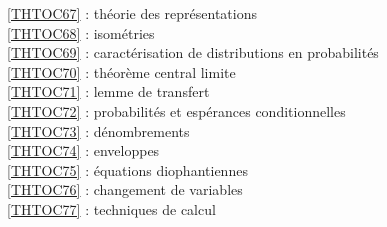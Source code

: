 \ref {THTOC67} : théorie des représentations\\
\ref {THTOC68} : isométries\\
\ref {THTOC69} : caractérisation de distributions en probabilités\\
\ref {THTOC70} : théorème central limite\\
\ref {THTOC71} : lemme de transfert\\
\ref {THTOC72} : probabilités et espérances conditionnelles\\
\ref {THTOC73} : dénombrements\\
\ref {THTOC74} : enveloppes\\
\ref {THTOC75} : équations diophantiennes\\
\ref {THTOC76} : changement de variables\\
\ref {THTOC77} : techniques de calcul\\
